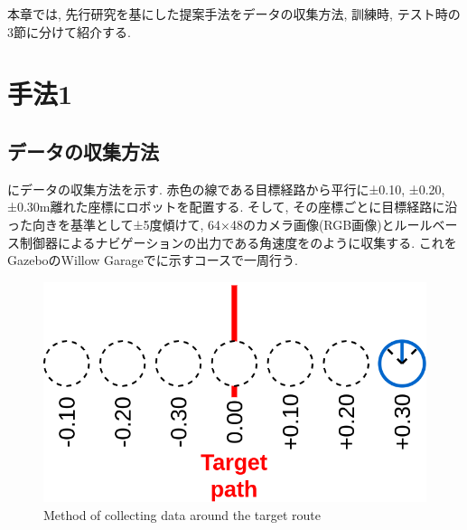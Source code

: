 
本章では, 先行研究を基にした提案手法をデータの収集方法, 訓練時, テスト時の3節に分けて紹介する.

\section{手法1}

\subsection{データの収集方法}
にデータの収集方法を示す. 赤色の線である目標経路から平行に±0.10, ±0.20, ±0.30m離れた座標にロボットを配置する. そして, その座標ごとに目標経路に沿った向きを基準として±5度傾けて, 64×48のカメラ画像(RGB画像)とルールベース制御器によるナビゲーションの出力である角速度をのように収集する. これをGazeboのWillow Garageでに示すコースで一周行う.


\begin{figure}[h]
  \centering
  \includegraphics[keepaspectratio, scale=0.25]{images/old-method.png}
  \caption{Method of collecting data around the target route}
  \label{Fig:old-method}
  \end{figure}


